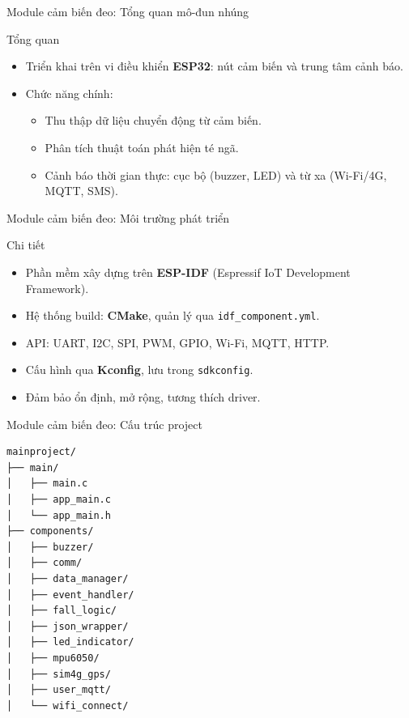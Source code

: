 \begin{frame}{Module cảm biến đeo: Tổng quan mô-đun nhúng}
    \begin{block}{Tổng quan}
        \begin{itemize}
            \item Triển khai trên vi điều khiển \textbf{ESP32}: nút cảm biến và trung tâm cảnh báo.
            \item Chức năng chính:
            \begin{itemize}
                \item Thu thập dữ liệu chuyển động từ cảm biến.
                \item Phân tích thuật toán phát hiện té ngã.
                \item Cảnh báo thời gian thực: cục bộ (buzzer, LED) và từ xa (Wi-Fi/4G, MQTT, SMS).
            \end{itemize}
        \end{itemize}
    \end{block}
\end{frame}

\begin{frame}{Module cảm biến đeo: Môi trường phát triển}
    \begin{block}{Chi tiết}
        \begin{itemize}
            \item Phần mềm xây dựng trên \textbf{ESP-IDF} (Espressif IoT Development Framework).
            \item Hệ thống build: \textbf{CMake}, quản lý qua \texttt{idf\_component.yml}.
            \item API: UART, I2C, SPI, PWM, GPIO, Wi-Fi, MQTT, HTTP.
            \item Cấu hình qua \textbf{Kconfig}, lưu trong \texttt{sdkconfig}.
            \item Đảm bảo ổn định, mở rộng, tương thích driver.
        \end{itemize}
    \end{block}
\end{frame}

\begin{frame}[fragile]{Module cảm biến đeo: Cấu trúc project}
    \renewcommand{\baselinestretch}{0.8}
    \begin{verbatim}
mainproject/
├── main/
│   ├── main.c
│   ├── app_main.c
│   └── app_main.h
├── components/
│   ├── buzzer/
│   ├── comm/
│   ├── data_manager/
│   ├── event_handler/
│   ├── fall_logic/
│   ├── json_wrapper/
│   ├── led_indicator/
│   ├── mpu6050/
│   ├── sim4g_gps/
│   ├── user_mqtt/
│   └── wifi_connect/
    \end{verbatim}
    \renewcommand{\baselinestretch}{1.0}
\end{frame}

